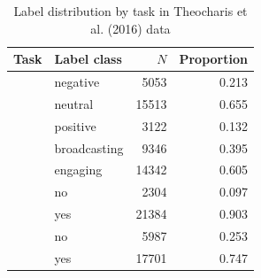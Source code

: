 \begin{table}[!t]

\caption{\label{tab:label_distribution_theocharis_et_al_2016}Label distribution by task in Theocharis et al. (2016) data}
\centering
\fontsize{10}{12}\selectfont
\begin{tabular}[t]{>{\raggedright\arraybackslash}L{2.2in}lrr}
\toprule
\headrow Task & Label class & $N$ & Proportion\\
\midrule
 & negative & 5053 & 0.213\\

 & neutral & 15513 & 0.655\\

 & positive & 3122 & 0.132\\
 & broadcasting & 9346 & 0.395\\

 & engaging & 14342 & 0.605\\
 & no & 2304 & 0.097\\

 & yes & 21384 & 0.903\\
 & no & 5987 & 0.253\\

 & yes & 17701 & 0.747\\
\bottomrule
\end{tabular}
\end{table}
